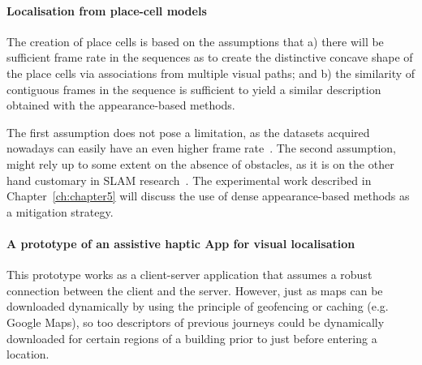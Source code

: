 \paragraph{Localisation from place-cell models}

The creation of place cells is based on the assumptions that a) there will be sufficient frame rate in the sequences as to create the distinctive concave shape of the place cells via associations from multiple visual paths; and b) the similarity of contiguous frames in the sequence is sufficient to yield a similar description obtained with the appearance-based methods. 

The first assumption does not pose a limitation, as the datasets acquired nowadays can easily have an even higher frame rate~\cite{sturm12iros}. The second assumption, might rely up to some extent on the absence of obstacles, as it is on the other hand customary in SLAM research~\cite{nardi2014introducing}. The experimental work described in Chapter~\ref{ch:chapter5} will discuss the use of dense appearance-based methods as a mitigation strategy.

\paragraph{A prototype of an assistive haptic App for visual localisation}

This prototype works as a client-server application that assumes a robust connection between the client and the server. However, just as maps can be downloaded dynamically by using the principle of geofencing or caching (e.g. Google Maps), so too descriptors of previous journeys could be dynamically downloaded for certain regions of a building prior to just before entering a location.
